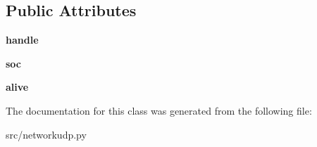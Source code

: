 \subsection*{Public Attributes}
\begin{DoxyCompactItemize}
\item 
\hypertarget{classsrc_1_1networkudp_1_1_network_client_ae3a6e8899b864601d8d1c43092ffbc1d}{}\label{classsrc_1_1networkudp_1_1_network_client_ae3a6e8899b864601d8d1c43092ffbc1d} 
{\bfseries handle}
\item 
\hypertarget{classsrc_1_1networkudp_1_1_network_client_ab331a8c61f46f49e2fc0beab52986ace}{}\label{classsrc_1_1networkudp_1_1_network_client_ab331a8c61f46f49e2fc0beab52986ace} 
{\bfseries soc}
\item 
\hypertarget{classsrc_1_1networkudp_1_1_network_client_a445685f7d171bc82c3ec6f11a2320ef3}{}\label{classsrc_1_1networkudp_1_1_network_client_a445685f7d171bc82c3ec6f11a2320ef3} 
{\bfseries alive}
\end{DoxyCompactItemize}


The documentation for this class was generated from the following file\+:\begin{DoxyCompactItemize}
\item 
src/networkudp.\+py\end{DoxyCompactItemize}
